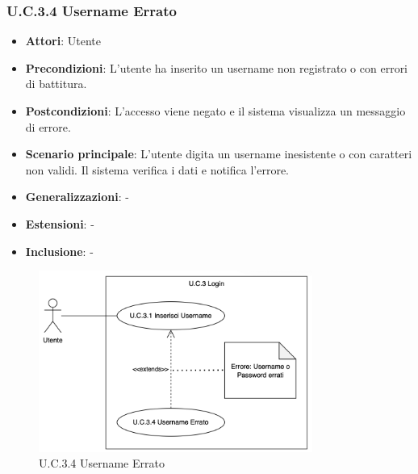 \subsubsection{U.C.3.4 Username Errato}
\begin{itemize}
    \item \textbf{Attori}: Utente
    \item \textbf{Precondizioni}: L'utente ha inserito un username non registrato o con errori di battitura.
    \item \textbf{Postcondizioni}: L'accesso viene negato e il sistema visualizza un messaggio di errore.
    \item \textbf{Scenario principale}: L'utente digita un username inesistente o con caratteri non validi. Il sistema verifica i dati e notifica l'errore.
    \item \textbf{Generalizzazioni}: -
    \item \textbf{Estensioni}: -
    \item \textbf{Inclusione}: -
\end{itemize}
\begin{figure}[H]
    \centering
    \includegraphics[width=0.8\textwidth]{img/U.C.3.4.png}
    \caption{U.C.3.4 Username Errato}
\end{figure}
\newpage

